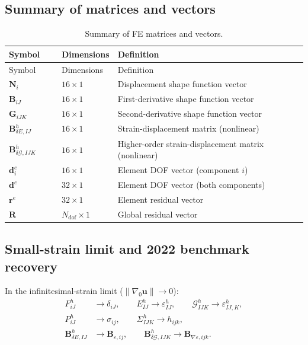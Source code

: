 \documentclass[11pt]{article}
\begin{document}
\subsection{Summary of matrices and vectors}
\label{ssec:summary}

\begin{longtable}[c]{>{\raggedright\arraybackslash}p{0.18\linewidth}
>{\raggedright\arraybackslash}p{0.15\linewidth}
>{\raggedright\arraybackslash}p{0.67\linewidth}}
\caption{Summary of FE matrices and vectors.}
\label{tab:fe_matrices}\\
\toprule
Symbol & Dimensions & Definition \\
\midrule
\endfirsthead
\toprule
Symbol & Dimensions & Definition \\
\midrule
\endhead
$\mathbf{N}_{i}$ & $16\times 1$ & Displacement shape function vector \\
$\mathbf{B}_{iJ}$ & $16\times 1$ & First-derivative shape function vector \\
$\mathbf{G}_{iJK}$ & $16\times 1$ & Second-derivative shape function vector \\
$\mathbf{B}_{\delta E,IJ}^{h}$ & $16\times 1$ & Strain-displacement matrix (nonlinear) \\
$\mathbf{B}_{\delta\mathcal{G},IJK}^{h}$ & $16\times 1$ & Higher-order strain-displacement matrix (nonlinear) \\
$\mathbf{d}_{i}^{e}$ & $16\times 1$ & Element DOF vector (component $i$) \\
$\mathbf{d}^{e}$ & $32\times 1$ & Element DOF vector (both components) \\
$\mathbf{r}^{e}$ & $32\times 1$ & Element residual vector \\
$\mathbf{R}$ & $N_{\mathrm{dof}}\times 1$ & Global residual vector \\
\bottomrule
\end{longtable}

\subsection{Small-strain limit and 2022 benchmark recovery}
\label{ssec:recovery}

In the infinitesimal-strain limit ($\|\nabla_{0}\mathbf{u}\|\to 0$):
\begin{align}
F_{iJ}^{h} &\to \delta_{iJ},
\qquad
E_{IJ}^{h} \to \varepsilon_{IJ}^{h},
\qquad
\mathcal{G}_{IJK}^{h} \to \varepsilon_{IJ,K}^{h},
\label{s6:lim_kin}\\
P_{iJ}^{h} &\to \sigma_{ij},
\qquad
\Sigma_{IJK}^{h} \to h_{ijk},
\label{s6:lim_stress}\\
\mathbf{B}_{\delta E,IJ}^{h} &\to \mathbf{B}_{\varepsilon,ij},
\qquad
\mathbf{B}_{\delta\mathcal{G},IJK}^{h} \to \mathbf{B}_{\nabla\varepsilon,ijk}.
\label{s6:lim_B}
\end{align}
\end{document}
